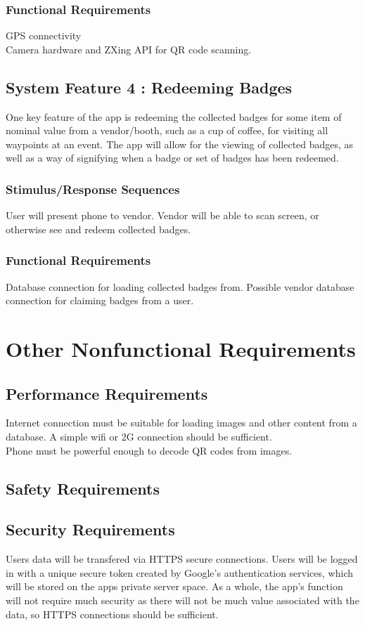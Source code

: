 \documentclass{scrreprt}
\begin{document}
\subsection{Functional Requirements}
GPS connectivity \\
Camera hardware and ZXing API for QR code scanning.

\section{System Feature 4 : Redeeming Badges}
One key feature of the app is redeeming the collected badges for some item of nominal value from
a vendor/booth, such as a cup of coffee, for visiting all waypoints at an event. The app will allow
for the viewing of collected badges, as well as a way of signifying when a badge or set of badges
has been redeemed.

\subsection{Stimulus/Response Sequences}
User will present phone to vendor. Vendor will be able to scan screen, or otherwise 
see and redeem collected badges.

\subsection{Functional Requirements}
Database connection for loading collected badges from. Possible vendor database connection 
for claiming badges from a user.


\chapter{Other Nonfunctional Requirements}

\section{Performance Requirements}
Internet connection must be suitable for loading images and other content from a 
database. A simple wifi or 2G connection should be sufficient. \\
Phone must be powerful enough to decode QR codes from images.

\section{Safety Requirements}


\section{Security Requirements}
Users data will be transfered via HTTPS secure connections. Users will be logged in
with a unique secure token created by Google's authentication services, which will
be stored on the apps private server space. As a whole, the app's function will 
not require much security as there will not be much value associated with the data,
so HTTPS connections should be sufficient. 
\end{document}
